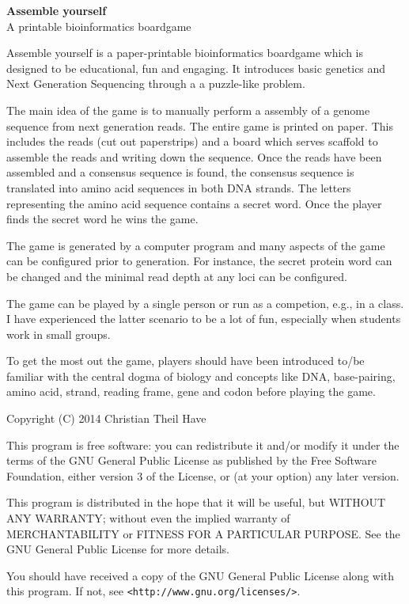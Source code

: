 \begin{titlepage}
\begin{center}
	{ \huge \bfseries Assemble yourself  \\[0.4cm] }
	A printable bioinformatics boardgame
\end{center}
{\large
Assemble yourself is a paper-printable bioinformatics boardgame which is designed to be educational, fun and engaging. 
It introduces basic genetics and Next Generation Sequencing through a a puzzle-like problem. 

The main idea of the game is to manually perform a assembly of a genome sequence
from next generation reads. The entire game is printed on paper. This includes the reads (cut out paperstrips) 
and a board which serves scaffold to assemble the reads and writing down the sequence.
Once the reads have been assembled and a consensus sequence is found, the consensus
sequence is translated into amino acid sequences in both DNA strands. The letters
representing the amino acid sequence contains a secret word. Once the player
finds the secret word he wins the game. 

The game is generated by a computer program and many aspects of the game can 
be configured prior to generation. For instance, the secret protein word
can be changed and the minimal read depth at any loci can be configured. 

The game can be played by a single person or run as a competion, e.g.,  in a class. I have experienced
the latter scenario to be a lot of fun, especially when students work in small groups. 

To get the most out the game, players should have been introduced to/be familiar with the central dogma of biology
and concepts like DNA, base-pairing, amino acid, strand, reading frame, gene and codon before playing the game.
}

\vfill 
{\small
Copyright (C) 2014 Christian Theil Have

This program is free software: you can redistribute it and/or modify
it under the terms of the GNU General Public License as published by
the Free Software Foundation, either version 3 of the License, or
(at your option) any later version.

This program is distributed in the hope that it will be useful,
but WITHOUT ANY WARRANTY; without even the implied warranty of
MERCHANTABILITY or FITNESS FOR A PARTICULAR PURPOSE.  See the
GNU General Public License for more details.

You should have received a copy of the GNU General Public License
along with this program.  If not, see \verb|<http://www.gnu.org/licenses/>|.
}

\end{titlepage}

